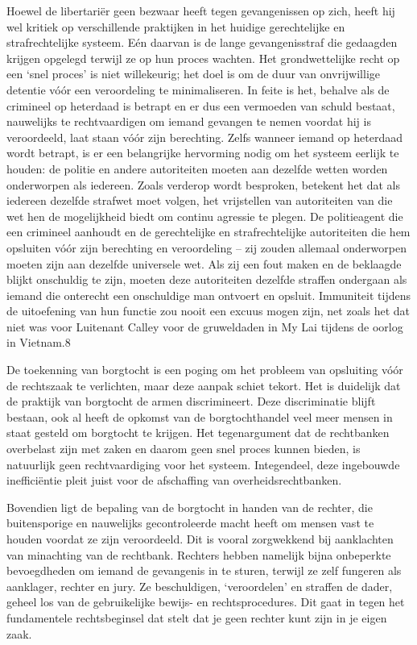 \documentclass[
  a5paper,
  smalldemyvopaper,10pt,twoside,onecolumn,openright,extrafontsizes,hidelinks]{memoir}
\begin{document}
Hoewel de libertariër geen bezwaar heeft tegen gevangenissen op zich,
heeft hij wel kritiek op verschillende praktijken in het huidige
gerechtelijke en strafrechtelijke systeem. Eén daarvan is de lange
gevangenisstraf die gedaagden krijgen opgelegd terwijl ze op hun proces
wachten. Het grondwettelijke recht op een `snel proces' is niet
willekeurig; het doel is om de duur van onvrijwillige detentie vóór een
veroordeling te minimaliseren. In feite is het, behalve als de crimineel
op heterdaad is betrapt en er dus een vermoeden van schuld bestaat,
nauwelijks te rechtvaardigen om iemand gevangen te nemen voordat hij is
veroordeeld, laat staan vóór zijn berechting. Zelfs wanneer iemand op
heterdaad wordt betrapt, is er een belangrijke hervorming nodig om het
systeem eerlijk te houden: de politie en andere autoriteiten moeten aan
dezelfde wetten worden onderworpen als iedereen. Zoals verderop wordt
besproken, betekent het dat als iedereen dezelfde strafwet moet volgen,
het vrijstellen van autoriteiten van die wet hen de mogelijkheid biedt
om continu agressie te plegen. De politieagent die een crimineel
aanhoudt en de gerechtelijke en strafrechtelijke autoriteiten die hem
opsluiten vóór zijn berechting en veroordeling -- zij zouden allemaal
onderworpen moeten zijn aan dezelfde universele wet. Als zij een fout
maken en de beklaagde blijkt onschuldig te zijn, moeten deze
autoriteiten dezelfde straffen ondergaan als iemand die onterecht een
onschuldige man ontvoert en opsluit. Immuniteit tijdens de uitoefening
van hun functie zou nooit een excuus mogen zijn, net zoals het dat niet
was voor Luitenant Calley voor de gruweldaden in My Lai tijdens de
oorlog in Vietnam.8

De toekenning van borgtocht is een poging om het probleem van opsluiting
vóór de rechtszaak te verlichten, maar deze aanpak schiet tekort. Het is
duidelijk dat de praktijk van borgtocht de armen discrimineert. Deze
discriminatie blijft bestaan, ook al heeft de opkomst van de
borgtochthandel veel meer mensen in staat gesteld om borgtocht te
krijgen. Het tegenargument dat de rechtbanken overbelast zijn met zaken
en daarom geen snel proces kunnen bieden, is natuurlijk geen
rechtvaardiging voor het systeem. Integendeel, deze ingebouwde
inefficiëntie pleit juist voor de afschaffing van overheidsrechtbanken.

Bovendien ligt de bepaling van de borgtocht in handen van de rechter,
die buitensporige en nauwelijks gecontroleerde macht heeft om mensen
vast te houden voordat ze zijn veroordeeld. Dit is vooral zorgwekkend
bij aanklachten van minachting van de rechtbank. Rechters hebben
namelijk bijna onbeperkte bevoegdheden om iemand de gevangenis in te
sturen, terwijl ze zelf fungeren als aanklager, rechter en jury. Ze
beschuldigen, `veroordelen' en straffen de dader, geheel los van de
gebruikelijke bewijs- en rechtsprocedures. Dit gaat in tegen het
fundamentele rechtsbeginsel dat stelt dat je geen rechter kunt zijn in
je eigen zaak.
\end{document}
